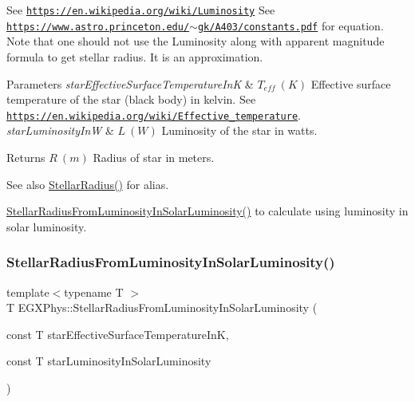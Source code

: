 See \href{https://en.wikipedia.org/wiki/Luminosity}{\tt https\+://en.\+wikipedia.\+org/wiki/\+Luminosity} See \href{https://www.astro.princeton.edu/~gk/A403/constants.pdf}{\tt https\+://www.\+astro.\+princeton.\+edu/$\sim$gk/\+A403/constants.\+pdf} for equation. Note that one should not use the Luminosity along with apparent magnitude formula to get stellar radius. It is an approximation.


\begin{DoxyParams}{Parameters}
{\em star\+Effective\+Surface\+Temperature\+InK} & $T_{eff}\ (K)$ Effective surface temperature of the star (black body) in kelvin. See \href{https://en.wikipedia.org/wiki/Effective_temperature}{\tt https\+://en.\+wikipedia.\+org/wiki/\+Effective\+\_\+temperature}. \\
\hline
{\em star\+Luminosity\+InW} & $L\ (W)$ Luminosity of the star in watts. \\
\hline
\end{DoxyParams}
\begin{DoxyReturn}{Returns}
$R\ (m)$ Radius of star in meters. 
\end{DoxyReturn}
\begin{DoxySeeAlso}{See also}
\mbox{\hyperlink{group___e_g_x_phys-_stellar_radius_ga612cd22c37341a1864cd2fc5c858e18e}{Stellar\+Radius()}} for alias. 

\mbox{\hyperlink{group___e_g_x_phys-_stellar_radius_ga49f0848777ba12cdfc78d112d82036ce}{Stellar\+Radius\+From\+Luminosity\+In\+Solar\+Luminosity()}} to calculate using luminosity in solar luminosity. 
\end{DoxySeeAlso}
\mbox{\label{group___e_g_x_phys-_stellar_radius_ga49f0848777ba12cdfc78d112d82036ce}} 
\subsubsection{\texorpdfstring{Stellar\+Radius\+From\+Luminosity\+In\+Solar\+Luminosity()}{StellarRadiusFromLuminosityInSolarLuminosity()}}
{\footnotesize\ttfamily template$<$typename T $>$ \\
T E\+G\+X\+Phys\+::\+Stellar\+Radius\+From\+Luminosity\+In\+Solar\+Luminosity (\begin{DoxyParamCaption}\item[{const T}]{star\+Effective\+Surface\+Temperature\+InK,  }\item[{const T}]{star\+Luminosity\+In\+Solar\+Luminosity }\end{DoxyParamCaption})}



